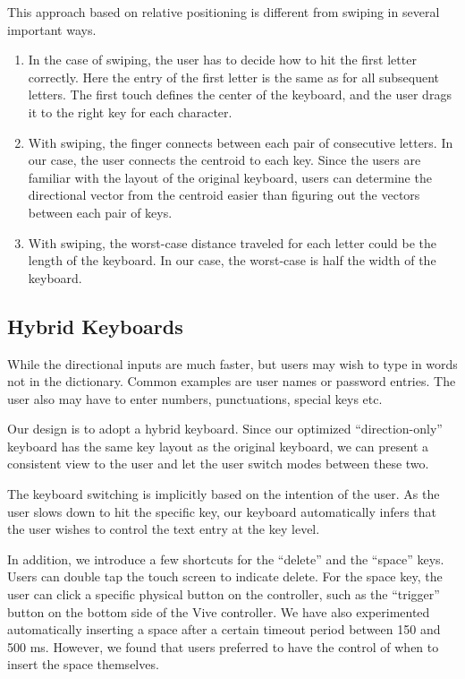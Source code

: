 This approach based on relative positioning is different from swiping in several important ways. 
\begin{enumerate}
\item
In the case of swiping, the user has to decide how to hit the first letter correctly.  Here the entry of the first letter is the same as for all subsequent letters.  The first touch defines the center of the keyboard, and the user drags it to the right key for each character.   
\item
With swiping, the finger connects between each pair of consecutive letters.  In our case, the user connects the centroid to each key.   Since the users are familiar with the layout of the original keyboard, users can determine the directional vector from the centroid easier than figuring out the vectors between each pair of keys. 
\item 
With swiping, the worst-case distance traveled for each letter could be the length of the keyboard.  In our case, the worst-case is half the width of the keyboard. 
\end{enumerate}




\subsection{Hybrid Keyboards}

While the directional inputs are much faster, but users may wish to type in words not in the dictionary.  Common examples are user names or password entries.  The user also may have to enter numbers, punctuations, special keys etc. 

Our design is to adopt a hybrid keyboard.  Since our optimized “direction-only” keyboard has the same key layout as the original keyboard, we can present a consistent view to the user and let the user switch modes between these two.  

The keyboard switching is implicitly based on the intention of the user.  As the user slows down to hit the specific key, our keyboard automatically infers that the user wishes to control the text entry at the key level. 

In addition, we introduce a few shortcuts for the “delete” and the “space” keys.   Users can double tap the touch screen to indicate delete.  For the space key, the user can click a specific physical button on the controller, such as the “trigger” button on the bottom side of the Vive controller.  We have also experimented automatically inserting a space after a certain timeout period between 150 and 500 ms.  However, we found that users preferred to have the control of when to insert the space themselves.   

